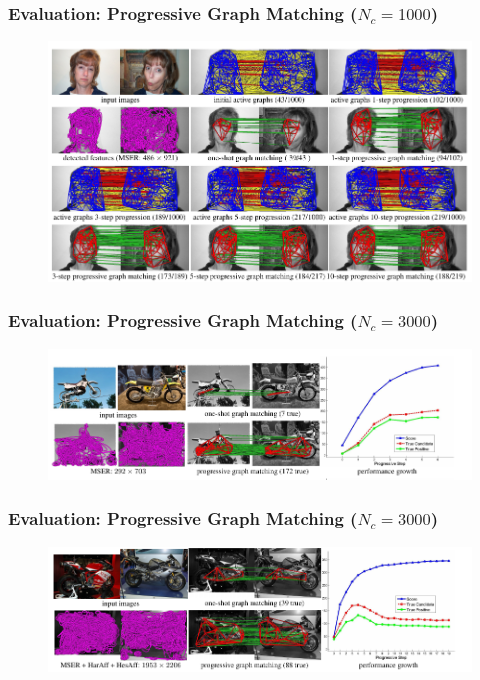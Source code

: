 \documentclass[hyperref={pdfpagelabels=false}]{beamer}
\begin{document}
\begin{frame}
\frametitle{Evaluation: Progressive Graph Matching ($N_c=1000$)}
\begin{figure}
  \includegraphics[scale=0.5]{fig1sub.png}
\end{figure}
\end{frame}

\begin{frame}
\frametitle{Evaluation: Progressive Graph Matching ($N_c=3000$)}
\begin{figure}
  \includegraphics[scale=0.5]{fig3asub.png}
\end{figure}
\end{frame}

\begin{frame}
\frametitle{Evaluation: Progressive Graph Matching ($N_c=3000$)}
\begin{figure}
  \includegraphics[scale=0.5]{fig3csub.png}
\end{figure}
\end{frame}
\end{document}
